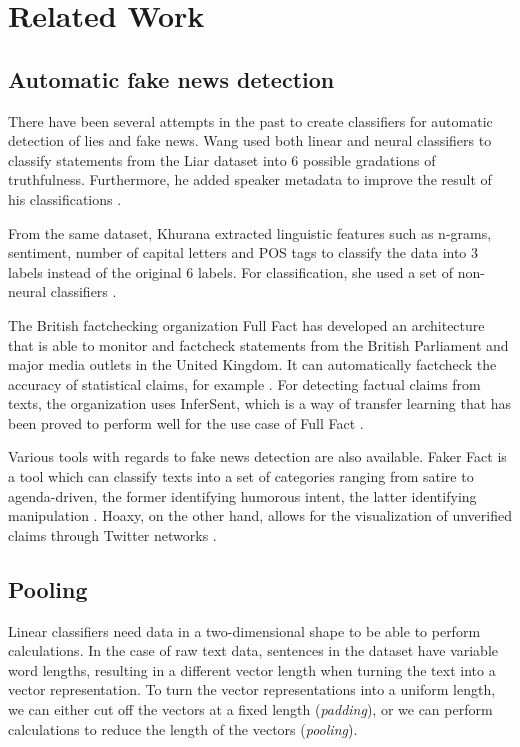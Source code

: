 \section{Related Work}
\subsection{Automatic fake news detection}
There have been several attempts in the past to create classifiers for automatic detection of lies and fake news. 
Wang used both linear and neural classifiers to classify statements from the Liar dataset into 6 possible gradations of truthfulness. 
Furthermore, he added speaker metadata to improve the result of his classifications \cite{wang2018}.

From the same dataset, Khurana extracted linguistic features such as n-grams, sentiment, number of capital letters and POS tags to classify the data into 3 labels instead of the original 6 labels. 
For classification, she used a set of non-neural classifiers \cite{khurana2017}.

The British factchecking organization Full Fact has developed an architecture that is able to monitor and factcheck statements from the British Parliament and major media outlets in the United Kingdom. 
It can automatically factcheck the accuracy of statistical claims, for example \cite{babakar2016}.
For detecting factual claims from texts, the organization uses InferSent, which is a way of transfer learning that has been proved to perform well for the use case of Full Fact \cite{pydata2018}.

Various tools with regards to fake news detection are also available. 
Faker Fact is a tool which can classify texts into a set of categories ranging from satire to agenda-driven, the former identifying humorous intent, the latter identifying manipulation \cite{fakerfact}. 
Hoaxy, on the other hand, allows for the visualization of unverified claims through Twitter networks \cite{shao2016}. 

\subsection{Pooling}
Linear classifiers need data in a two-dimensional shape to be able to perform calculations. 
In the case of raw text data, sentences in the dataset have variable word lengths, resulting in a different vector length when turning the text into a vector representation.
To turn the vector representations into a uniform length, we can either cut off the vectors at a fixed length (\textit{padding}), or we can perform calculations to reduce the length of the vectors (\textit{pooling}).

